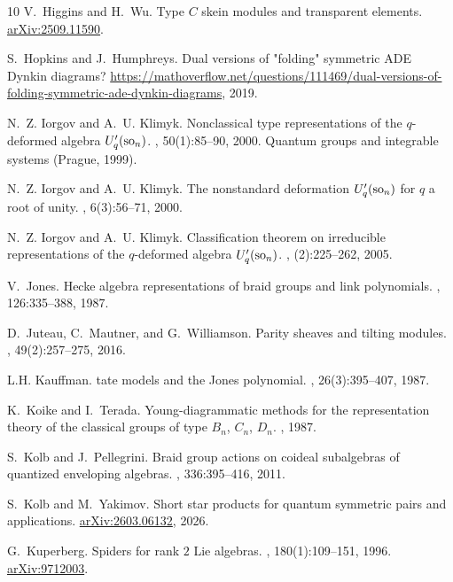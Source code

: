 \documentclass[10pt]{amsart}
\numberwithin{equation}{section}
\newcommand{\arxiv}[1]{\href{https://arxiv.org/abs/#1}{\small  arXiv:#1}}
\theoremstyle{definition}
\begin{document}
\begin{thebibliography}{10}
V.~Higgins and H.~Wu.
\newblock Type {$C$} skein modules and transparent elements.
\newblock \arxiv{2509.11590}.

S.~Hopkins and J.~Humphreys.
\newblock Dual versions of {"folding"} symmetric {ADE} {D}ynkin diagrams?
\newblock
  \url{https://mathoverflow.net/questions/111469/dual-versions-of-folding-symmetric-ade-dynkin-diagrams},
  2019.

N.~Z. Iorgov and A.~U. Klimyk.
\newblock Nonclassical type representations of the {$q$}-deformed algebra
  {$U'_q({\rm so}_n)$}.
, 50(1):85--90, 2000.
\newblock Quantum groups and integrable systems (Prague, 1999).

N.~Z. Iorgov and A.~U. Klimyk.
\newblock The nonstandard deformation {$U_q'({\rm so}_n)$} for {$q$} a root of
  unity.
, 6(3):56--71, 2000.

N.~Z. Iorgov and A.~U. Klimyk.
\newblock Classification theorem on irreducible representations of the
  {$q$}-deformed algebra {$U_q'({\rm so}_n)$}.
, (2):225--262, 2005.

V.~Jones.
\newblock Hecke algebra representations of braid groups and link polynomials.
, 126:335--388, 1987.

D.~Juteau, C.~Mautner, and G.~Williamson.
\newblock Parity sheaves and tilting modules.
, 49(2):257--275, 2016.

L.H. Kauffman.
tate models and the {J}ones polynomial.
, 26(3):395--407, 1987.

K.~Koike and I.~Terada.
\newblock Young-diagrammatic methods for the representation theory of the
  classical groups of type {$B_n$}, {$C_n$}, {$D_n$}.
, 1987.

S.~Kolb and J.~Pellegrini.
\newblock Braid group actions on coideal subalgebras of quantized enveloping
  algebras.
, 336:395--416, 2011.

S.~Kolb and M.~Yakimov.
\newblock Short star products for quantum symmetric pairs and applications.
\newblock \arxiv{2603.06132}, 2026.

G.~Kuperberg.
\newblock Spiders for rank {$2$} {L}ie algebras.
, 180(1):109--151, 1996.
\newblock \href{http://arxiv.org/abs/9712003}{arXiv:9712003}.


\end{thebibliography}
\end{document}
